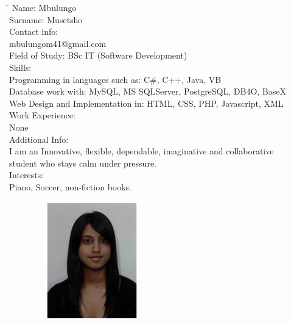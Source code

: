 \documentclass[12pt]{article}
\begin{document}
	\begin{tabbing}
		\hspace*{3.5cm}\=\hspace*{3cm} \kill
		Name: \> Mbulungo \\
		Surname: \> Musetsho \\
		Contact info:  \\
			\> mbulungom41@gmail.com \\
		Field of Study: \> BSc IT (Software Development) \\
		Skills: \\
			\> Programming in languages such as: C\#, C++, Java, VB \\
			\> Database work with: MySQL, MS SQLServer, PostgreSQL, DB4O, BaseX \\
			\> Web Design and Implementation in: HTML, CSS, PHP, Javascript, XML \\
		Work Experience: \\
			\> None \\
		Additional Info: \\
			\> I am an Innovative,  flexible, dependable, imaginative and collaborative \\ \> student who stays calm under pressure.\\
		Interests: \\
			\> Piano, Soccer, non-fiction books. \\
	\end{tabbing}

	\newpage 
	\begin{figure}[ht!]
		\centering
		\includegraphics[width=2in, height=2in]{./Pictures/Verushka.jpg}
	\end{figure}
	
\end{document}
